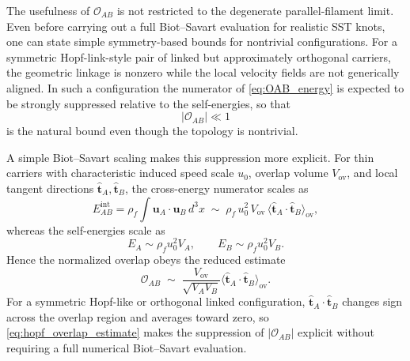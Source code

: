 \documentclass[11pt]{article}
\begin{document}
            The usefulness of \(\mathcal{O}_{AB}\) is not restricted to the degenerate parallel-filament limit. Even before carrying out a full Biot--Savart evaluation for realistic SST knots, one can state simple symmetry-based bounds for nontrivial configurations. For a symmetric Hopf-link-style pair of linked but approximately orthogonal carriers, the geometric linkage is nonzero while the local velocity fields are not generically aligned. In such a configuration the numerator of \cref{eq:OAB_energy} is expected to be strongly suppressed relative to the self-energies, so that
            \begin{equation}
                |\mathcal{O}_{AB}|\ll 1
            \end{equation}
            is the natural bound even though the topology is nontrivial.

            A simple Biot--Savart scaling makes this suppression more explicit. For thin carriers with characteristic induced speed scale \(u_0\), overlap volume \(V_{\mathrm{ov}}\), and local tangent directions \(\hat{\mathbf{t}}_A,\hat{\mathbf{t}}_B\), the cross-energy numerator scales as
            \begin{equation}
                E_{AB}^{\mathrm{int}}
                =
                \rho_{\!f}\int \mathbf{u}_A\cdot\mathbf{u}_B\,d^3x
                \;\sim\;
                \rho_{\!f}\,u_0^2\,V_{\mathrm{ov}}\,
                \big\langle \hat{\mathbf{t}}_A\cdot\hat{\mathbf{t}}_B \big\rangle_{\mathrm{ov}},
                \label{eq:hopf_scaling}
            \end{equation}
            whereas the self-energies scale as
            \begin{equation}
                E_A \sim \rho_{\!f}u_0^2V_A,
                \qquad
                E_B \sim \rho_{\!f}u_0^2V_B.
            \end{equation}
            Hence the normalized overlap obeys the reduced estimate
            \begin{equation}
                \mathcal{O}_{AB}
                \;\sim\;
                \frac{V_{\mathrm{ov}}}{\sqrt{V_A V_B}}
                \big\langle \hat{\mathbf{t}}_A\cdot\hat{\mathbf{t}}_B \big\rangle_{\mathrm{ov}}.
                \label{eq:hopf_overlap_estimate}
            \end{equation}
            For a symmetric Hopf-like or orthogonal linked configuration, \(\hat{\mathbf{t}}_A\cdot\hat{\mathbf{t}}_B\) changes sign across the overlap region and averages toward zero, so \cref{eq:hopf_overlap_estimate} makes the suppression of \(|\mathcal{O}_{AB}|\) explicit without requiring a full numerical Biot--Savart evaluation.
\end{document}
